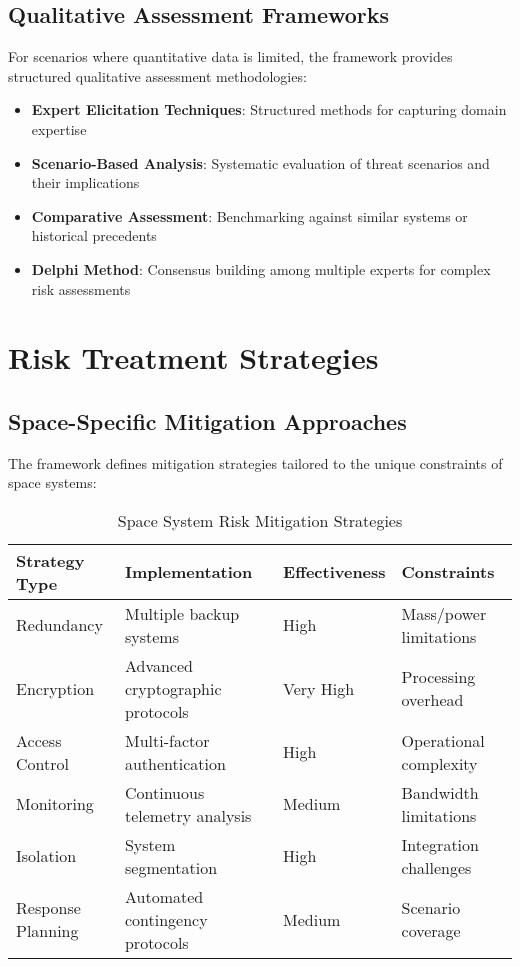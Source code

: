 \documentclass[binding=0.6cm]{sapthesis}
\begin{document}
\subsection{Qualitative Assessment Frameworks}

For scenarios where quantitative data is limited, the framework provides structured qualitative assessment methodologies:

\begin{itemize}
    \item \textbf{Expert Elicitation Techniques}: Structured methods for capturing domain expertise
    \item \textbf{Scenario-Based Analysis}: Systematic evaluation of threat scenarios and their implications
    \item \textbf{Comparative Assessment}: Benchmarking against similar systems or historical precedents
    \item \textbf{Delphi Method}: Consensus building among multiple experts for complex risk assessments
\end{itemize}

\section{Risk Treatment Strategies}

\subsection{Space-Specific Mitigation Approaches}

The framework defines mitigation strategies tailored to the unique constraints of space systems:

\begin{table}[H]
\centering
\caption{Space System Risk Mitigation Strategies}
\begin{tabular}{|l|l|l|l|}
\hline
\textbf{Strategy Type} & \textbf{Implementation} & \textbf{Effectiveness} & \textbf{Constraints} \\ \hline
Redundancy & Multiple backup systems & High & Mass/power limitations \\ \hline
Encryption & Advanced cryptographic protocols & Very High & Processing overhead \\ \hline
Access Control & Multi-factor authentication & High & Operational complexity \\ \hline
Monitoring & Continuous telemetry analysis & Medium & Bandwidth limitations \\ \hline
Isolation & System segmentation & High & Integration challenges \\ \hline
Response Planning & Automated contingency protocols & Medium & Scenario coverage \\ \hline
\end{tabular}
\end{table}
\end{document}
